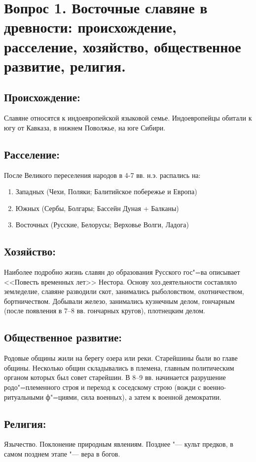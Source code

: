 \section{Вопрос 1. Восточные славяне в древности: происхождение, расселение, хозяйство, общественное развитие, религия.}

\subsection{Происхождение:}

Славяне относятся к индоевропейской языковой семье. Индоевропейцы обитали к югу от Кавказа, в нижнем Поволжье, на юге Сибири.

\subsection{Расселение:}

После Великого переселения народов в 4-7 вв. н.э. распались на:

\begin{enumerate}
    \item {Западных (Чехи, Поляки; Балитийское побережье и Европа)}
    \item {Южных (Сербы, Болгары; Бассейн Дуная + Балканы)}
    \item {Восточных (Русские, Белорусы; Верховье Волги, Ладога)}
\end{enumerate}

\subsection{Хозяйство:}

Наиболее подробно жизнь славян до образования Русского гос"=ва описывает <<Повесть временных лет>> Нестора. Основу хоз.деятельности составляло земледелие, славяне разводили скот, занимались рыболовством, охотничеством, бортничеством. Добывали железо, занимались кузнечным делом, гончарным (после появления в 7--8 вв. гончарных кругов), плотнецким делом.

\subsection{Общественное развитие:}

Родовые общины жили на берегу озера или реки. Старейшины были во главе общины. Несколько общин складывались в племена, главным политическим органом которых был совет старейшин. В 8--9 вв. начинается разрушение родо"=племенного строя и переход к соседскому строю (вожди с военно-ритуальными ф"=циями, сила военных), а затем к военной демократии.

\subsection{Религия:}

Язычество. Поклонение природным явлениям. Позднее "--- культ предков, в самом позднем этапе "--- вера в богов.

